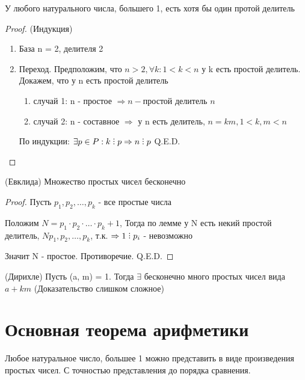 \begin{lemma}
  У любого натурального числа, большего 1, есть хотя бы один протой делитель
\end{lemma}

\begin{proof} (Индукция)
  \begin{enumerate}
    \item База n = 2, делителя 2
    \item Переход. Предположим, что $ n > 2, \forall k: 1 < k < n$ у k есть простой делитель. Докажем, что у n есть простой делитель
    
    \begin{enumerate}
      \item случай 1: n - простое $\Rightarrow n - \text{простой делитель } n$
      \item случай 2: n - составное $\Rightarrow$ у n есть делитель, $n = km, 1 < k, m < n$
    \end{enumerate}

    По индукции: $\exists p \in P: k \divby p \Rightarrow n \divby p$ Q.E.D.
  \end{enumerate}
\end{proof}

\begin{theorem} (Евклида)
  Множество простых чисел бесконечно
\end{theorem}

\begin{proof}
  Пусть $p_1, p_2, \ldots, p_k$ - все простые числа

  Положим $N = p_1 \cdot p_2 \cdot \ldots \cdot p_k + 1$, Тогда по лемме у N есть некий простой делитель,  $N p_1, p_2, \ldots, p_k$, т.к. $\Rightarrow 1 \divby p_i$ - невозможно

  Значит N - простое. Противоречие. Q.E.D.

\end{proof}

\begin{theorem} (Дирихле)
  Пусть (a, m) = 1. Тогда $\exists$ бесконечно много простых чисел вида $a + km$ (Доказательство слишком сложное)
\end{theorem}

\section{Основная теорема арифметики}

\begin{theorem}
  Любое натуральное число, большее 1 можно представить в виде произведения простых чисел. С точностью представления до порядка сравнения.
\end{theorem}

